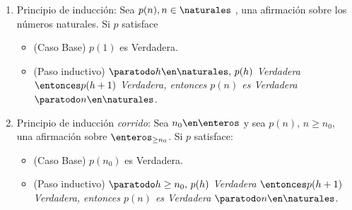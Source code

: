 \begin{enumerate}
	\item Principio de inducción: Sea $p(n), n \in \naturales$ , una afirmación sobre los números naturales.
	      Si $p$ satisface
	      \begin{itemize}
		      \item (Caso Base) $p(1)$ es Verdadera.
		      \item (Paso inductivo) $\paratodo h \en \naturales,\, p(h)$ \textit{Verdadera}
		            $\entonces p(h+1)$ \textit{Verdadera, entonces $p(n)$ es Verdadera} $\paratodo n \en \naturales$.
	      \end{itemize}

	\item Principio de inducción \textit{corrido}: Sea $n_0 \en \enteros$ y sea $p(n),\, n\geq n_0,\,$ una afirmación sobre $\enteros_{\geq n_0}$. Si $p$
	      satisface:
	      \begin{itemize}
		      \item (Caso Base) $p(n_0)$ es Verdadera.
		      \item (Paso inductivo) $\paratodo h \geq n_0,\, p(h)$ \textit{Verdadera}
		            $\entonces p(h+1)$ \textit{Verdadera, entonces $p(n)$ es Verdadera} $\paratodo n \en \naturales$.
	      \end{itemize}
\end{enumerate}

